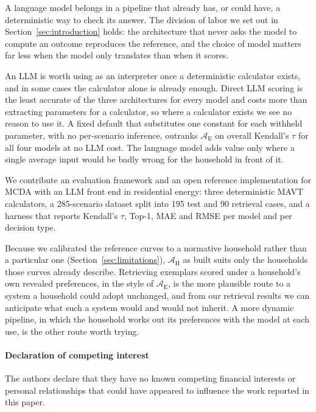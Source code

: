 \documentclass[final,3p,times]{elsarticle}
\begin{document}
A language model belongs in a pipeline that already has, or could have, a deterministic way to check its answer. The division of labor we set out in Section~\ref{sec:introduction} holds: the architecture that never asks the model to compute an outcome reproduces the reference, and the choice of model matters far less when the model only translates than when it scores.

An LLM is worth using as an interpreter once a deterministic calculator exists, and in some cases the calculator alone is already enough. Direct LLM scoring is the least accurate of the three architectures for every model and costs more than extracting parameters for a calculator, so where a calculator exists we see no reason to use it. A fixed default that substitutes one constant for each withheld parameter, with no per-scenario inference, outranks $\mathcal{A}_{\text{E}}$ on overall Kendall's $\tau$ for all four models at no LLM cost. The language model adds value only where a single average input would be badly wrong for the household in front of it.

We contribute an evaluation framework and an open reference implementation for MCDA with an LLM front end in residential energy: three deterministic MAVT calculators, a 285-scenario dataset split into 195 test and 90 retrieval cases, and a harness that reports Kendall's $\tau$, Top-1, MAE and RMSE per model and per decision type.

Because we calibrated the reference curves to a normative household rather than a particular one (Section~\ref{sec:limitations}), $\mathcal{A}_{\text{H}}$ as built suits only the households those curves already describe. Retrieving exemplars scored under a household's own revealed preferences, in the style of $\mathcal{A}_{\text{E}}$, is the more plausible route to a system a household could adopt unchanged, and from our retrieval results we can anticipate what such a system would and would not inherit. A more dynamic pipeline, in which the household works out its preferences with the model at each use, is the other route worth trying.

\clearpage

\paragraph*{Declaration of competing interest}
The authors declare that they have no known competing financial interests or personal relationships that could have appeared to influence the work reported in this paper.
\end{document}
